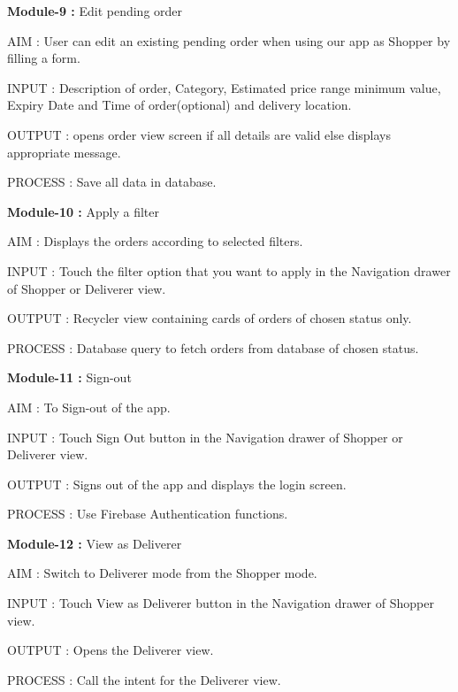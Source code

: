 \documentclass{report}
\begin{document}
\noindent \newline \textbf{Module-9 :} Edit pending order
\begin{description}
\item AIM : User can edit an existing pending order when using our app as Shopper by filling a form.
\item INPUT : Description of order, Category, Estimated price range minimum value, Expiry Date and Time of order(optional) and delivery location.
\item OUTPUT : opens order view screen if all details are valid else displays appropriate message.
\item PROCESS : Save all data in database.
\end{description}

\noindent \newline \textbf{Module-10 :} Apply a filter
\begin{description}
\item AIM : Displays the orders according to selected filters.
\item INPUT : Touch the filter option that you want to apply in the Navigation drawer of Shopper or Deliverer view.
\item OUTPUT : Recycler view containing cards of orders of chosen status only.
\item PROCESS : Database query to fetch orders from database of chosen status.
\end{description}

\noindent \newline \textbf{Module-11 :} Sign-out
\begin{description}
\item AIM : To Sign-out of the app.
\item INPUT : Touch Sign Out button in the Navigation drawer\cite{c13} of Shopper or Deliverer view.
\item OUTPUT : Signs out of the app and displays the login screen.
\item PROCESS : Use Firebase Authentication functions.
\end{description}

\noindent \newline \textbf{Module-12 :} View as Deliverer
\begin{description}
\item AIM : Switch to Deliverer mode from the Shopper mode.
\item INPUT : Touch View as Deliverer button in the Navigation drawer of Shopper view.
\item OUTPUT : Opens the Deliverer view.
\item PROCESS : Call the intent for the Deliverer view.
\end{description}
\end{document}
